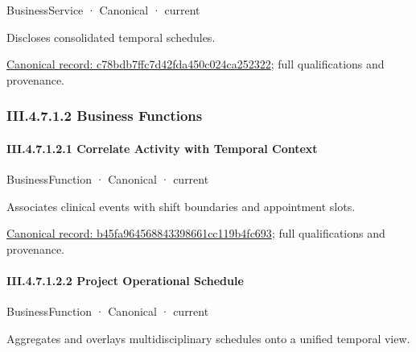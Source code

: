 \label{element:c78bdb7ffc7d42fda450c024ca252322}
{\small BusinessService · Canonical · current}\par

Discloses consolidated temporal schedules.


{\footnotesize \href{../../../../continuum/business/business-service/c78bdb7ffc7d42fda450c024ca252322.md}{Canonical record: c78bdb7ffc7d42fda450c024ca252322}; full qualifications and provenance.}\par
\subsubsection*{III.4.7.1.2 Business Functions}
\label{navigation:III.4.7.1.2}

\paragraph*{III.4.7.1.2.1 Correlate Activity with Temporal Context}
\label{navigation:III.4.7.1.2.1}

\label{element:b45fa964568843398661cc119b4fc693}
{\small BusinessFunction · Canonical · current}\par

Associates clinical events with shift boundaries and appointment slots.


{\footnotesize \href{../../../../continuum/business/business-function/b45fa964568843398661cc119b4fc693.md}{Canonical record: b45fa964568843398661cc119b4fc693}; full qualifications and provenance.}\par
\paragraph*{III.4.7.1.2.2 Project Operational Schedule}
\label{navigation:III.4.7.1.2.2}

\label{element:3ca2e6a5ca614df991a2e1a060f0f1d8}
{\small BusinessFunction · Canonical · current}\par

Aggregates and overlays multidisciplinary schedules onto a unified temporal view.


